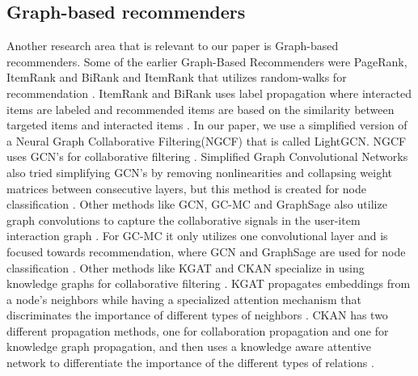 \subsection{Graph-based recommenders}
Another research area that is relevant to our paper is Graph-based recommenders.
Some of the earlier Graph-Based Recommenders were PageRank, ItemRank and BiRank and ItemRank that utilizes random-walks for recommendation \cite{PageRank,BiRank,ItemRank}.
ItemRank and BiRank uses label propagation where interacted items are labeled and recommended items are based on the similarity between targeted items and interacted items \cite{BiRank,ItemRank}.
In our paper, we use a simplified version of a Neural Graph Collaborative Filtering(NGCF) that is called LightGCN.
NGCF uses GCN's for collaborative filtering \cite{lightgcn, NGCF}.
Simplified Graph Convolutional Networks also tried simplifying GCN's by removing nonlinearities and collapsing weight matrices between consecutive layers, but this method is created for node classification \cite{lightgcn,SGCN}.
Other methods like GCN, GC-MC and GraphSage also utilize graph convolutions to capture the collaborative signals in the user-item interaction graph \cite{GCN,GC_MC,GraphSage}.
For GC-MC it only utilizes one convolutional layer and is focused towards recommendation\cite{GC_MC}, where GCN and GraphSage are used for node classification \cite{GCN,GraphSage}.
Other methods like KGAT and CKAN specialize in using knowledge graphs for collaborative filtering \cite{KGAT,CKAN}.
KGAT propagates embeddings from a node's neighbors while having a specialized attention mechanism that discriminates the importance of different types of neighbors \cite{KGAT}.
CKAN has two different propagation methods, one for collaboration propagation and one for knowledge graph propagation, and then uses a knowledge aware attentive network to differentiate the importance of the different types of relations \cite{CKAN}.


